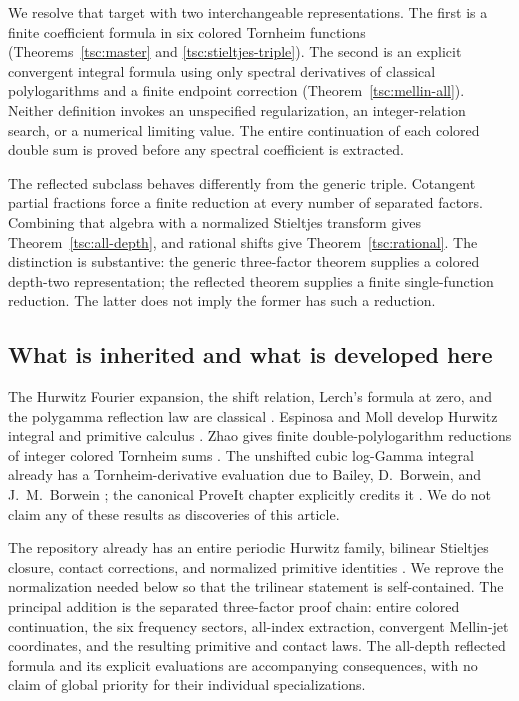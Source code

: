 \documentclass[11pt]{article}
\numberwithin{equation}{section}
\theoremstyle{definition}\newtheorem{definition}[theorem]{Definition}
\theoremstyle{remark}\newtheorem{remark}[theorem]{Remark}
\begin{document}
We resolve that target with two interchangeable representations. The first
is a finite coefficient formula in six colored Tornheim functions
(Theorems~\ref{tsc:master} and \ref{tsc:stieltjes-triple}). The second is an
explicit convergent integral formula using only spectral derivatives of
classical polylogarithms and a finite endpoint correction
(Theorem~\ref{tsc:mellin-all}). Neither definition invokes an unspecified
regularization, an integer-relation search, or a numerical limiting value.
The entire continuation of each colored double sum is proved before any
spectral coefficient is extracted.

The reflected subclass behaves differently from the generic triple.
Cotangent partial fractions force a finite reduction at every number of
separated factors. Combining that algebra with a normalized Stieltjes
transform gives Theorem~\ref{tsc:all-depth}, and rational shifts give
Theorem~\ref{tsc:rational}. The distinction is substantive: the generic
three-factor theorem supplies a colored depth-two representation; the
reflected theorem supplies a finite single-function reduction. The latter
does not imply the former has such a reduction.

\subsection{What is inherited and what is developed here}
The Hurwitz Fourier expansion, the shift relation, Lerch's formula at zero,
and the polygamma reflection law are classical \cite{tsc:dlmf-zeta,tsc:dlmf-gamma}.
Espinosa and Moll develop Hurwitz integral and primitive calculus
\cite{tsc:em1,tsc:em2}. Zhao gives finite double-polylogarithm reductions of
integer colored Tornheim sums \cite{tsc:zhao}. The unshifted cubic
log-Gamma integral already has a Tornheim-derivative evaluation due to
Bailey, D.~Borwein, and J.~M.~Borwein \cite{tsc:bbb}; the canonical ProveIt
chapter explicitly credits it \cite{tsc:gamma-chapter}. We do not claim any
of these results as discoveries of this article.

The repository already has an entire periodic Hurwitz family, bilinear
Stieltjes closure, contact corrections, and normalized primitive identities
\cite{tsc:repo,tsc:shj}. We reprove the normalization needed below so that
the trilinear statement is self-contained. The principal addition is the
separated three-factor proof chain: entire colored continuation, the six
frequency sectors, all-index extraction, convergent Mellin-jet coordinates,
and the resulting primitive and contact laws. The all-depth reflected
formula and its explicit evaluations are accompanying consequences, with
no claim of global priority for their individual specializations.
\end{document}
